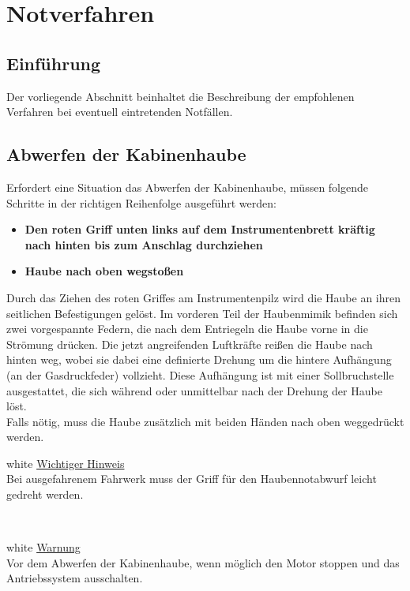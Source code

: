 \chapter{ Notverfahren}
\pagecolor{red}
\section{Einführung}
Der vorliegende Abschnitt beinhaltet die Beschreibung der empfohlenen Verfahren bei eventuell eintretenden Notfällen.

\section{Abwerfen der Kabinenhaube}
Erfordert eine Situation das Abwerfen der Kabinenhaube, müssen folgende Schritte in der richtigen Reihenfolge ausgeführt werden:
\begin{itemize}
\item \textbf{Den roten Griff unten links auf dem Instrumentenbrett kräftig nach hinten bis zum Anschlag durchziehen}
\item \textbf{Haube nach oben wegstoßen}
\end{itemize}

Durch das Ziehen des roten Griffes am Instrumentenpilz wird die Haube an ihren seitlichen Befestigungen gelöst. Im vorderen Teil der Haubenmimik befinden sich zwei vorgespannte Federn, die nach dem Entriegeln die Haube vorne in die Strömung drücken. Die jetzt angreifenden Luftkräfte reißen die Haube nach hinten weg, wobei sie dabei eine definierte Drehung um die hintere Aufhängung (an der Gasdruckfeder) vollzieht. Diese Aufhängung ist mit einer Sollbruchstelle ausgestattet, die sich während oder unmittelbar nach der Drehung der Haube löst.\\
Falls nötig, muss die Haube zusätzlich mit beiden Händen nach oben weggedrückt werden.\\
\newline
\newline
\begin{color}{white}
\large{\underline{Wichtiger Hinweis}}\\
Bei ausgefahrenem Fahrwerk muss der Griff für den Haubennotabwurf leicht gedreht werden.
\end{color}\\

\begin{color}{white}
\large{\underline{Warnung}}\\
Vor dem Abwerfen der Kabinenhaube, wenn möglich den Motor
stoppen und das Antriebssystem ausschalten.
\end{color}


